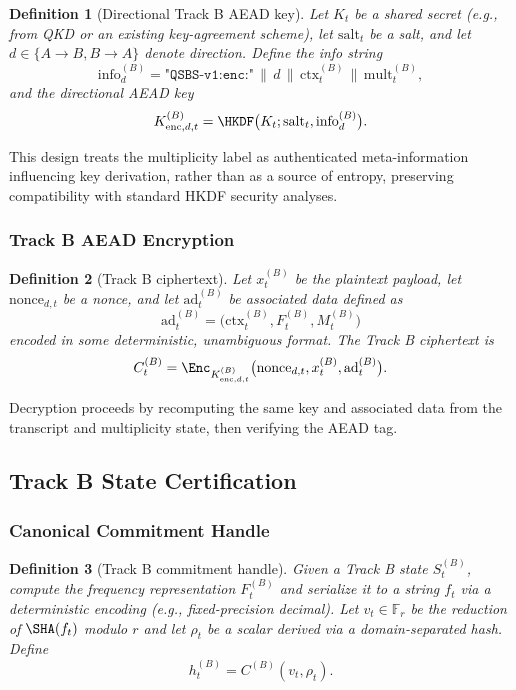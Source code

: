 \documentclass[11pt]{article}
\newtheorem{definition}{Definition}[section]
\newcommand{\F}{\mathbb{F}}
\begin{document}
\begin{definition}[Directional Track B AEAD key]
Let \(K_t\) be a shared secret (e.g., from QKD or an existing key-agreement scheme),
let \(\mathrm{salt}_t\) be a salt, and let \(d \in \{A\to B, B\to A\}\) denote direction.
Define the info string
\[
  \mathrm{info}_d^{(B)} = \texttt{"QSBS-v1:enc:"} \, \| \, d \, \| \, \mathrm{ctx}_t^{(B)} \, \| \, \mathrm{mult}_t^{(B)},
\]
and the directional AEAD key
\[
  K_{\mathrm{enc},d,t}^{(B)} = \HKDF\bigl(K_t; \mathrm{salt}_t, \mathrm{info}_d^{(B)}\bigr).
\]
\end{definition}

This design treats the multiplicity label as authenticated meta-information influencing key derivation, rather than as a source of entropy, preserving compatibility with standard HKDF security analyses.

\subsubsection{Track B AEAD Encryption}

\begin{definition}[Track B ciphertext]
Let \(x_t^{(B)}\) be the plaintext payload, let \(\mathrm{nonce}_{d,t}\) be a nonce,
and let \(\mathrm{ad}_t^{(B)}\) be associated data defined as
\[
  \mathrm{ad}_t^{(B)} = \bigl(\mathrm{ctx}_t^{(B)}, F_t^{(B)}, M_t^{(B)}\bigr)
\]
encoded in some deterministic, unambiguous format.
The Track B ciphertext is
\[
  C_t^{(B)} = \Enc_{K_{\mathrm{enc},d,t}^{(B)}}\bigl(\mathrm{nonce}_{d,t}, x_t^{(B)}, \mathrm{ad}_t^{(B)}\bigr).
\]
\end{definition}

Decryption proceeds by recomputing the same key and associated data from the transcript and multiplicity state, then verifying the AEAD tag.

\subsection{Track B State Certification}

\subsubsection{Canonical Commitment Handle}

\begin{definition}[Track B commitment handle]
Given a Track B state \(S_t^{(B)}\), compute the frequency representation \(F_t^{(B)}\)
and serialize it to a string \(f_t\) via a deterministic encoding (e.g., fixed-precision decimal).
Let \(v_t \in \F_r\) be the reduction of \(\SHA(f_t)\) modulo \(r\) and let \(\rho_t\) be a scalar derived via a domain-separated hash.
Define
\[
  h_t^{(B)} = C^{(B)}(v_t, \rho_t).
\]
\end{definition}
\end{document}
